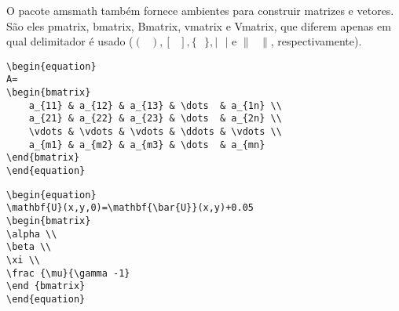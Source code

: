 \begin{frame}[fragile]
O pacote amsmath também fornece ambientes para construir matrizes e vetores. São eles pmatrix, bmatrix, Bmatrix, vmatrix e Vmatrix, que diferem apenas em qual delimitador é usado ($(\text{ }), [\text{ }], \{\text{ }\}, |\text{ }|$ e $\|\text{ }\|$, respectivamente).
\begin{lstlisting}[linewidth=9cm]
\begin{equation}
A=
\begin{bmatrix}
    a_{11} & a_{12} & a_{13} & \dots  & a_{1n} \\
    a_{21} & a_{22} & a_{23} & \dots  & a_{2n} \\
    \vdots & \vdots & \vdots & \ddots & \vdots \\
    a_{m1} & a_{m2} & a_{m3} & \dots  & a_{mn}
\end{bmatrix}
\end{equation}
\end{lstlisting}
\end{frame}

\begin{frame}[fragile]
\begin{lstlisting}
\begin{equation}
\mathbf{U}(x,y,0)=\mathbf{\bar{U}}(x,y)+0.05
\begin{bmatrix}
\alpha \\
\beta \\
\xi \\
\frac {\mu}{\gamma -1}
\end {bmatrix}
\end{equation}
\end{lstlisting}
\end{frame}
